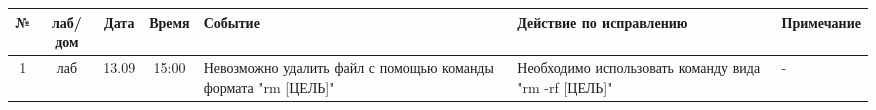 \begin{tabular}{|c|c|c|c|p{3cm}|p{4cm}|l|}
	\hline
	№ & лаб/дом & Дата & Время & Событие & Действие по исправлению & Примечание \\
	\hline 
	1 & лаб & 13.09 & 15:00 & Невозможно удалить файл с помощью команды формата "rm [ЦЕЛЬ]" & Необходимо использовать команду вида "rm -rf [ЦЕЛЬ]" & - \\
	\hline
\end{tabular}